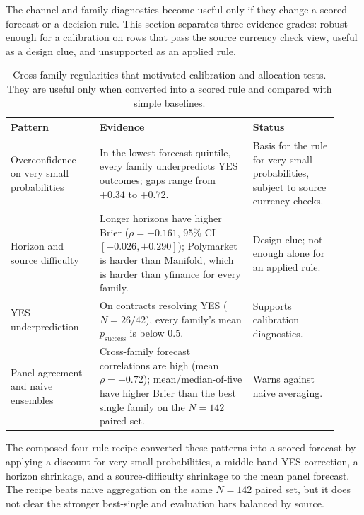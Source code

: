 \documentclass[11pt]{article}
\begin{document}
The channel and family diagnostics become useful only if they change a scored forecast or a decision rule. This section separates three evidence grades: robust enough for a calibration on rows that pass the source currency check view, useful as a design clue, and unsupported as an applied rule.

\begin{table}[htbp]
\centering
\small
\begin{tabular}{L{0.25\linewidth} L{0.43\linewidth} L{0.24\linewidth}}
\toprule
Pattern & Evidence & Status \\
\midrule
Overconfidence on very small probabilities & In the lowest forecast quintile, every family underpredicts YES outcomes; gaps range from \(+0.34\) to \(+0.72\). & Basis for the rule for very small probabilities, subject to source currency checks. \\
Horizon and source difficulty & Longer horizons have higher Brier (\(\rho=+0.161\), 95\% CI \([+0.026,+0.290]\)); Polymarket is harder than Manifold, which is harder than yfinance for every family. & Design clue; not enough alone for an applied rule. \\
YES underprediction & On contracts resolving YES (\(N=26/42\)), every family's mean \(p_{\text{success}}\) is below \(0.5\). & Supports calibration diagnostics. \\
Panel agreement and naive ensembles & Cross-family forecast correlations are high (mean \(\rho=+0.72\)); mean/median-of-five have higher Brier than the best single family on the \(N=142\) paired set. & Warns against naive averaging. \\
\bottomrule
\end{tabular}
\caption{Cross-family regularities that motivated calibration and allocation tests. They are useful only when converted into a scored rule and compared with simple baselines.}
\label{tab:applied-patterns}
\end{table}

The composed four-rule recipe converted these patterns into a scored forecast by applying a discount for very small probabilities, a middle-band YES correction, a horizon shrinkage, and a source-difficulty shrinkage to the mean panel forecast. The recipe beats naive aggregation on the same \(N=142\) paired set, but it does not clear the stronger best-single and evaluation bars balanced by source.
\end{document}
